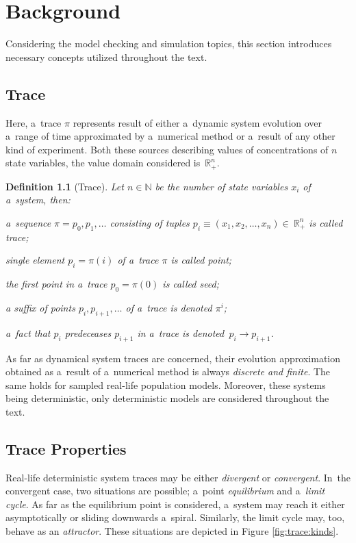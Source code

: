 \documentclass[12pt,twoside,draft]{fithesis}
\newcommand{\mReal}{\mathbb{R}}
\newcommand{\mNatural}{\mathbb{N}}
\newtheorem{mydef}{Definition}
\begin{document}
\chapter{Background}
Considering the model checking and simulation topics, this section
introduces necessary concepts utilized throughout the text.

\section{Trace}
Here, a~trace $\pi$ represents result of either a~dynamic system
evolution over a~range of time\cite{sven,pospisil} approximated by
a~numerical method or a~result of any other kind of experiment.
Both these sources describing values of concentrations of $n$ state
variables, the value domain considered is~$\mReal_{+}^n$.

\begin{mydef}[Trace]
Let $n\in\mNatural$ be the number of state variables $x_i$ of a~system,
then:
\begin{inparaenum}
\item a~sequence $\pi=p_0,p_1,\dotsc$ consisting of tuples
$p_i\equiv(x_1,x_2,\dotsc,x_n)\in~\mReal_{+}^n$ is called trace;
\item single element $p_i=\pi(i)$ of a~trace $\pi$ is called point;
\item the first point in a~trace $p_0=\pi(0)$ is called seed;
\item a suffix of points $p_i,p_{i+1},\dotsc$ of a~trace is
denoted $\pi^i$;
\item a~fact that $p_i$ predeceases $p_{i+1}$ in a~trace is
denoted~$p_i\rightarrow p_{i+1}$.
\end{inparaenum}
\end{mydef}

As far as dynamical system traces are concerned, their evolution approximation
obtained as a~result of a~numerical method is always \emph{discrete and
finite}. The same holds for sampled real-life population models.
Moreover, these systems being deterministic\cite{sven}, only
deterministic models are considered throughout the text.

\section{Trace Properties}
Real-life deterministic system traces may be either \emph{divergent} or
\emph{convergent}. In~the convergent case, two situations are possible;
a~point \emph{equilibrium} and a~\emph{limit cycle}. As far as the
equilibrium point is considered, a~system may reach it either
asymptotically or sliding downwards a~spiral. Similarly, the limit
cycle may, too, behave as an \emph{attractor}. These situations are depicted
in Figure \ref{fig:trace:kinds}.
\end{document}
